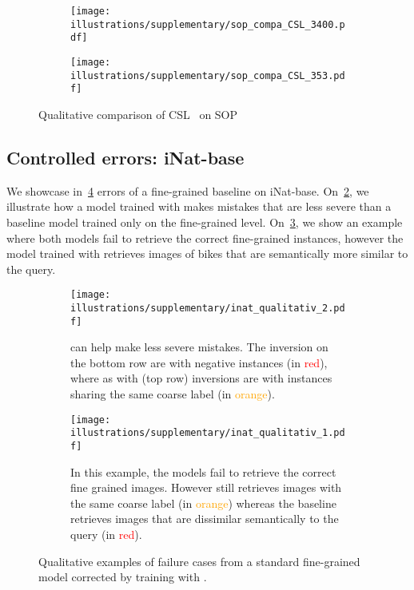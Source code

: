 \begin{figure}[ht]
    \centering
        
    \begin{subfigure}[t]{\textwidth}
        \texttt{[image: illustrations/supplementary/sop\_compa\_CSL\_3400.pdf]}
\end{subfigure}
    
    \begin{subfigure}[t]{\textwidth}
    \texttt{[image: illustrations/supplementary/sop\_compa\_CSL\_353.pdf]}
\end{subfigure}

    \caption{Qualitative comparison of \HAPPIER \vs CSL~\cite{sun2021dynamic} on SOP}
    \label{fig:happier_vs_csl}
\end{figure}


\subsection{Controlled errors: iNat-base} 

We showcase in~\cref{fig:sup_qualitative_results} errors of \HAPPIER \vs a fine-grained baseline on iNat-base. On~\cref{fig:sup_qual_inat_good}, we illustrate how a model trained with \HAPPIER makes mistakes that are less severe than a baseline model trained only on the fine-grained level. On~\cref{fig:sup_qual_inat_error}, we show an example where both models fail to retrieve the correct fine-grained instances, however the model trained with \HAPPIER retrieves images of bikes that are semantically more similar to the query.



\begin{figure}[ht]
    \centering
        
    \begin{subfigure}[t]{\textwidth}
        \texttt{[image: illustrations/supplementary/inat\_qualitativ\_2.pdf]}
        \caption{\HAPPIER can help make less severe mistakes. The inversion on the bottom row are with negative instances (in \textcolor{red}{red}), where as with \HAPPIER (top row) inversions are with instances sharing the same coarse label (in \textcolor{orange}{orange}).}
        \label{fig:sup_qual_inat_good}
    \end{subfigure}
    
    \begin{subfigure}[t]{\textwidth}
    \texttt{[image: illustrations/supplementary/inat\_qualitativ\_1.pdf]}
    \caption{In this example, the models fail to retrieve the correct fine grained images. However \HAPPIER still retrieves images with the same coarse label (in \textcolor{orange}{orange}) whereas the baseline retrieves images that are dissimilar semantically to the query (in \textcolor{red}{red}).}
    \label{fig:sup_qual_inat_error}
    \end{subfigure}

    \caption{Qualitative examples of failure cases from a standard fine-grained model corrected by training with \HAPPIER.}
    \label{fig:sup_qualitative_results}
\end{figure}


